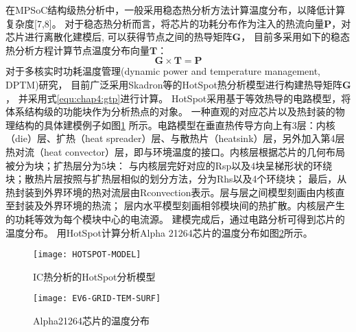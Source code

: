 在MPSoC结构级热分析中，一般采用稳态热分析方法计算温度分布，以降低计算复杂度[7,8]。 对于稳态热分析而言，将芯片的功耗分布作为注入的热流向量$\mathbf{P}$，对芯片进行离散化建模后, 可以获得节点之间的热导矩阵$\mathbf{G}$， 目前多采用如下的稳态热分析方程计算节点温度分布向量$\mathbf{T}$：
\begin{equation}
\label{equ:chap4:gtp}
\mathbf{G} \times \mathbf{T} = \mathbf{P}
\end{equation}
对于多核实时功耗温度管理(dynamic power and temperature management, DPTM)研究， 目前广泛采用Skadron等的HotSpot热分析模型进行构建热导矩阵$\mathbf{G}$， 并采用式\ref{equ:chap4:gtp}进行计算。 HotSpot采用基于等效热导的电路模型，将体系结构级的功能块作为分析热点的对象。 一种直观的对应芯片以及热封装的物理结构的具体建模例子如图\ref{fig:hotspot-model} 所示。电路模型在垂直热传导方向上有3层：内核（die）层、扩热（heat spreader）层、与散热片（heatsink）层，另外加入第4层热对流（heat convector）层，即与环境温度的接口。内核层根据芯片的几何布局被分为块；扩热层分为5块： 与内核层完好对应的Rsp以及4块呈梯形状的环绕块；散热片层按照与扩热层相似的划分方法，分为Rhs以及4个环绕块； 最后，从热封装到外界环境的热对流层由Rconvection表示。层与层之间模型刻画由内核直至封装及外界环境的热流； 层内水平模型刻画相邻模块间的热扩散。内核层产生的功耗等效为每个模块中心的电流源。 建模完成后，通过电路分析可得到芯片的温度分布。 用HotSpot计算分析Alpha 21264芯片的温度分布如图\ref{fig:ev6-grid-temp-surf}所示。

\begin{figure}[H]
  \centering
  \texttt{[image: HOTSPOT-MODEL]}
  \caption{IC热分析的HotSpot分析模型}
  \label{fig:hotspot-model}
\end{figure}

\begin{figure}[H]
  \centering
  \texttt{[image: EV6-GRID-TEM-SURF]}
  \caption{Alpha21264芯片的温度分布}
  \label{fig:ev6-grid-temp-surf}
\end{figure}


